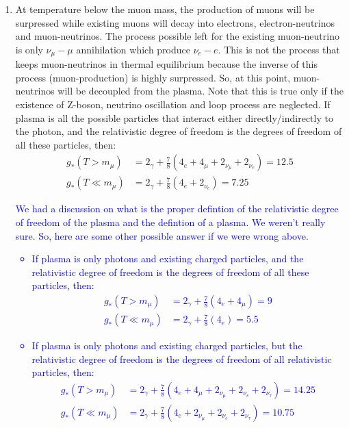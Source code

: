 \begin{enumerate}[label=\alph*)]
\item At temperature below the muon mass, the production of muons will be surpressed while existing muons will decay into electrons, electron-neutrinos and muon-neutrinos. The process possible left for the existing muon-neutrino is only $\nu_\mu-\mu$ annihilation which produce $\nu_e-e$. This is not the process that keeps muon-neutrinos in thermal equilibrium because the inverse of this process (muon-production) is highly surpressed. So, at this point, muon-neutrinos will be decoupled from the plasma. Note that this is true only if the existence of Z-boson, neutrino oscillation and loop process are neglected.
If plasma is all the possible particles that interact either directly/indirectly to the photon,
and the relativistic degree of freedom is the degrees of freedom of all these particles, then:
\begin{align}
g_{\ast} (T>m_{\mu}) &= 2_{\gamma} + \frac{7}{8} (4_e + 4_{\mu} +  2_{\nu_{\mu}} + 2_{\nu_{e}}) =  12.5 \\
g_{\ast} (T \ll m_{\mu}) &= 2_{\gamma} + \frac{7}{8} (4_e +  2_{\nu_{e}}) =  7.25 
\end{align}

\textcolor{blue}{We had a discussion on what is the proper defintion of the relativistic degree of freedom of the plasma and the defintion of a plasma.  We weren't really sure. So, here are some other possible answer if we were wrong above.
\begin{itemize}
\item  If plasma is only photons and existing  charged particles, and the relativistic degree of freedom is the degrees of freedom of all these particles, then:
\begin{align}
g_{\ast} (T>m_{\mu}) &= 2_{\gamma} + \frac{7}{8} (4_e + 4_{\mu}) =  9 \\
g_{\ast} (T \ll m_{\mu}) &= 2_{\gamma} + \frac{7}{8} (4_e ) =   5.5
\end{align}
\item  If plasma is only photons and existing charged particles, but the relativistic degree of freedom is the degrees of freedom of all relativistic particles, then:
\begin{align}
g_{\ast} (T>m_{\mu}) &= 2_{\gamma} + \frac{7}{8} (4_e + 4_{\mu} +  2_{\nu_{\mu}} + 2_{\nu_{e}} + 2_{\nu_{\tau}}) =  14.25\\
g_{\ast} (T \ll m_{\mu}) &= 2_{\gamma} + \frac{7}{8} (4_e + 2_{\nu_{\mu}} + 2_{\nu_{e}} + 2_{\nu_{\tau}}) =  10.75
\end{align}
\end{itemize}
}


\end{enumerate}
